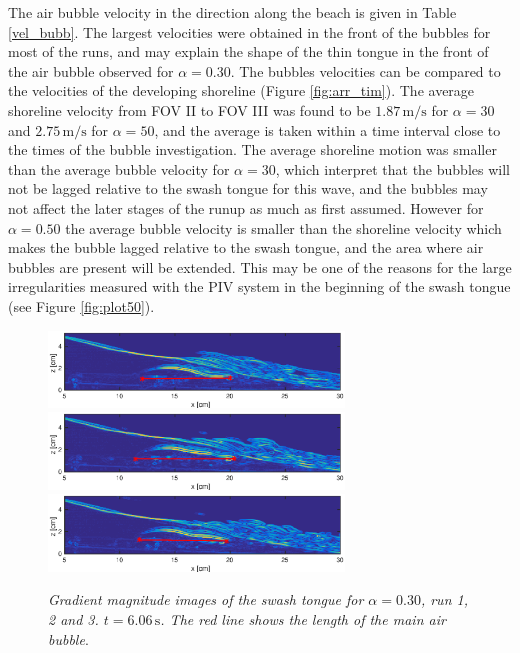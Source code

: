 \documentclass[review, authoryear]{elsarticle}
\newcommand{\s}{\,\mbox{s}}
\newcommand{\mps}{\,\mbox{m/s}}
\begin{document}
The air bubble velocity in the direction along the beach is given in Table \ref{vel_bubb}. The largest velocities were obtained in the front of the bubbles for most of the runs, and may explain the shape of the thin tongue in the front of the air bubble observed for $\alpha=0.30$. The bubbles velocities can be compared to the velocities of the developing shoreline (Figure \ref{fig:arr_tim}). The average shoreline velocity from  FOV II to FOV III was found to be $1.87\mps$ for $\alpha=30$ and $2.75\mps$ for $\alpha=50$, and the average is taken within a time interval close to the times of the bubble investigation. The average shoreline motion was smaller than the average bubble velocity for $\alpha=30$, which interpret that the bubbles will not be lagged relative to the swash tongue for this wave, and the bubbles may not affect the later stages of the runup as much as first assumed. However for $\alpha=0.50$ the average bubble velocity is smaller than the shoreline velocity which makes the bubble lagged relative to the swash tongue, and the area where air bubbles are present will be extended. This may be one of the reasons for the large irregularities measured with the PIV system in the beginning of the swash tongue (see Figure \ref{fig:plot50}).
\begin{figure}[]
\centering
\includegraphics[width=0.7\textwidth]{./Figures/BUBBLE/bubble_30_run1.eps}
\includegraphics[width=0.7\textwidth]{./Figures/BUBBLE/bubble_30_run2.eps}
\includegraphics[width=0.7\textwidth]{./Figures/BUBBLE/bubble_30_run3.eps}
\caption{\textit{Gradient magnitude images of the swash tongue for $\alpha=0.30$, run 1, 2 and 3. $t=6.06\s$. The red line shows the length of the main air bubble}.}
\label{fig:bubble_30}
\end{figure}
\end{document}
